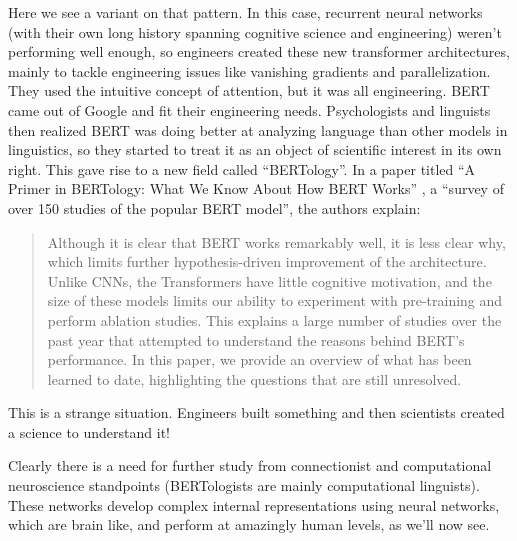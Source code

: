 Here we see a variant on that pattern. In this case, recurrent neural networks (with their own long history spanning cognitive science and engineering) weren't performing well enough, so engineers created these new transformer architectures, mainly to tackle engineering issues like vanishing gradients and parallelization.  They used the intuitive concept of attention, but it was all engineering. BERT came out of Google and fit their engineering needs. Psychologists and linguists then realized  BERT was doing better at analyzing language than other models in linguistics, so they started to treat it as an object of scientific interest in its own right. This gave rise to a new field called ``BERTology''. In a paper titled ``A Primer in BERTology: What We Know About How BERT Works'' \cite{rogers2020primer}, a ``survey of over 150 studies of the popular BERT model'',  the authors explain:
\begin{quote}
Although it is clear that BERT works remarkably well, it is less clear why, which limits further hypothesis-driven improvement of the architecture. Unlike CNNs, the Transformers have little cognitive motivation, and the size of these models limits our ability to experiment with pre-training and perform ablation studies. This explains a large number of studies over the past year that attempted to understand the reasons behind BERT’s performance. In this paper, we provide an overview of what has been learned to date, highlighting the questions that are still unresolved.
\end{quote}
This is a strange situation. Engineers built something and then scientists created a science to understand it!  

Clearly there is a need for further study from connectionist and computational neuroscience standpoints (BERTologists are mainly computational linguists).  These networks develop complex internal representations using neural networks, which are brain like, and perform at amazingly human levels, as we'll now see.




